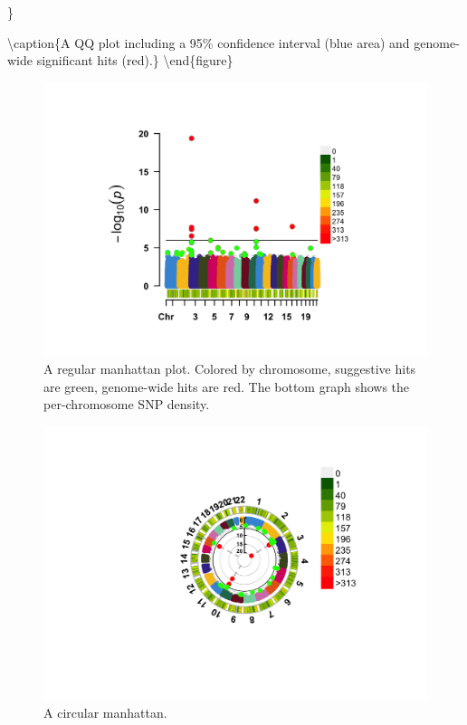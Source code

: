 \documentclass[
]{book}
\begin{document}
\}

\textbackslash caption\{A QQ plot including a 95\% confidence interval (blue area) and genome-wide significant hits (red).\}\label{fig:show-cmplot-all-qq}
\textbackslash end\{figure\}

\begin{figure}

{\centering \includegraphics[width=18.67in]{img/show-cmplot-all-manhattan} 

}

\caption{A regular manhattan plot. Colored by chromosome, suggestive hits are green, genome-wide hits are red. The bottom graph shows the per-chromosome SNP density.}\label{fig:show-cmplot-all-manhattan}
\end{figure}

\begin{figure}

{\centering \includegraphics[width=18.67in]{img/show-cmplot-all-circular} 

}

\caption{A circular manhattan.}\label{fig:show-cmplot-all-circular}
\end{figure}
\end{document}

